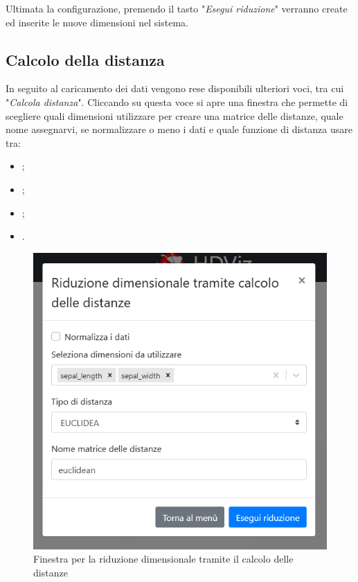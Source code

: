 Ultimata la configurazione, premendo il tasto "\textit{Esegui riduzione}" verranno create ed inserite le nuove dimensioni nel sistema.

\newpage
\subsection{Calcolo della distanza}
In seguito al caricamento dei dati vengono rese disponibili ulteriori voci, tra cui "\textit{Calcola distanza}". Cliccando su questa voce si apre una finestra che permette di scegliere quali dimensioni utilizzare per creare una matrice delle distanze, quale nome assegnarvi, se normalizzare o meno i dati e quale funzione di distanza usare tra:

\begin{itemize}
	\item {};
	\item {};
	\item {};
	\item {}.
\end{itemize}

\begin{figure}[H]
		\includegraphics[scale=0.65]{Images/CalcoloDistanze.png}
		\centering
		\caption{Finestra per la riduzione dimensionale tramite il calcolo delle distanze}
\end{figure}

